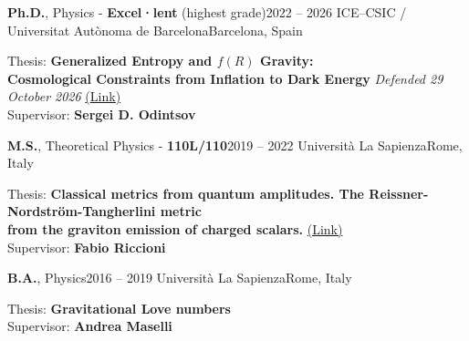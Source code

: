 \resumeSubHeadingListStart
    \resumeSubheading
      {\textbf{Ph.D.}, Physics - \textbf{Excel·lent} (highest grade)}{2022 -- 2026}
      {ICE--CSIC /  Universitat Autònoma de Barcelona}{Barcelona, Spain}
  \resumeSubHeadingListEnd
\vspace{0.9cm}
\begin{indentedtext}
\normalsize{Thesis: \textbf{Generalized Entropy and $f(R)$ Gravity:\\\quad \quad \quad Cosmological Constraints from Inflation to Dark Energy} \textit{Defended 29 October 2026} \href{https://www.tdx.cat/handle/10803/698804}{(\underline{Link})} \\\small{Supervisor:} \textbf{Sergei D. Odintsov}
}
\end{indentedtext}
\vspace{-0.2cm}

\resumeSubHeadingListStart
    \resumeSubheading
      {\textbf{M.S.}, Theoretical Physics - \textbf{110L/110}}{2019 -- 2022}
      {Università La Sapienza}{Rome, Italy}
  \resumeSubHeadingListEnd
\vspace{0.9cm}
\begin{indentedtext}
\normalsize{Thesis: \textbf{Classical metrics from quantum amplitudes. The Reissner-Nordström-Tangherlini metric\\\quad \quad \quad  from
the graviton emission of charged scalars.} \href{https://inspirehep.net/literature/2079300}{(\underline{Link})} \\\small{Supervisor:} \textbf{Fabio Riccioni}
}
\end{indentedtext}
\vspace{-0.2cm}

\resumeSubHeadingListStart
    \resumeSubheading
      {\textbf{B.A.}, Physics}{2016 -- 2019}
      {Università La Sapienza}{Rome, Italy}
  \resumeSubHeadingListEnd
\vspace{0.9cm}
\begin{indentedtext}
\normalsize{Thesis: \textbf{Gravitational Love numbers} \\\small{Supervisor:} \textbf{Andrea Maselli}
}
\end{indentedtext}
\vspace{-15pt}
